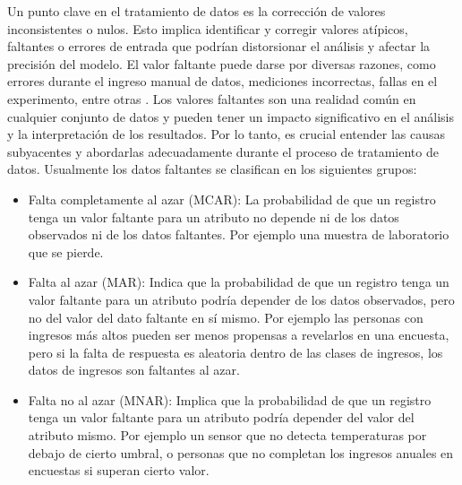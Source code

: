 Un punto clave en el tratamiento de datos es la corrección de valores inconsistentes o nulos. Esto implica identificar y corregir valores atípicos, faltantes o errores de entrada que podrían distorsionar el análisis y afectar la precisión del modelo. El valor faltante puede darse por diversas razones, como errores durante el ingreso manual de datos, mediciones incorrectas, fallas en el experimento, entre otras \citep{CAP2ARTICULO1}. Los valores faltantes son una realidad común en cualquier conjunto de datos y pueden tener un impacto significativo en el análisis y la interpretación de los resultados. Por lo tanto, es crucial entender las causas subyacentes y abordarlas adecuadamente durante el proceso de tratamiento de datos. Usualmente los datos faltantes se clasifican en los siguientes grupos: 
\begin{itemize}
\item Falta completamente al azar (MCAR): La probabilidad de que un registro tenga un valor faltante para un atributo no depende ni de los datos observados ni de los datos faltantes. Por ejemplo una muestra de laboratorio que se pierde.
\item Falta al azar (MAR): Indica que la probabilidad de que un registro tenga un valor faltante para un atributo podría depender de los datos observados, pero no del valor del dato faltante en sí mismo. Por ejemplo las personas con ingresos más altos pueden ser menos propensas a revelarlos en una encuesta, pero si la falta de respuesta es aleatoria dentro de las clases de ingresos, los datos de ingresos son faltantes al azar.
\item Falta no al azar (MNAR): Implica que la probabilidad de que un registro tenga un valor faltante para un atributo podría depender del valor del atributo mismo. Por ejemplo un sensor que no detecta temperaturas por debajo de cierto umbral, o personas que no completan los ingresos anuales en encuestas si superan cierto valor.
\end{itemize}

